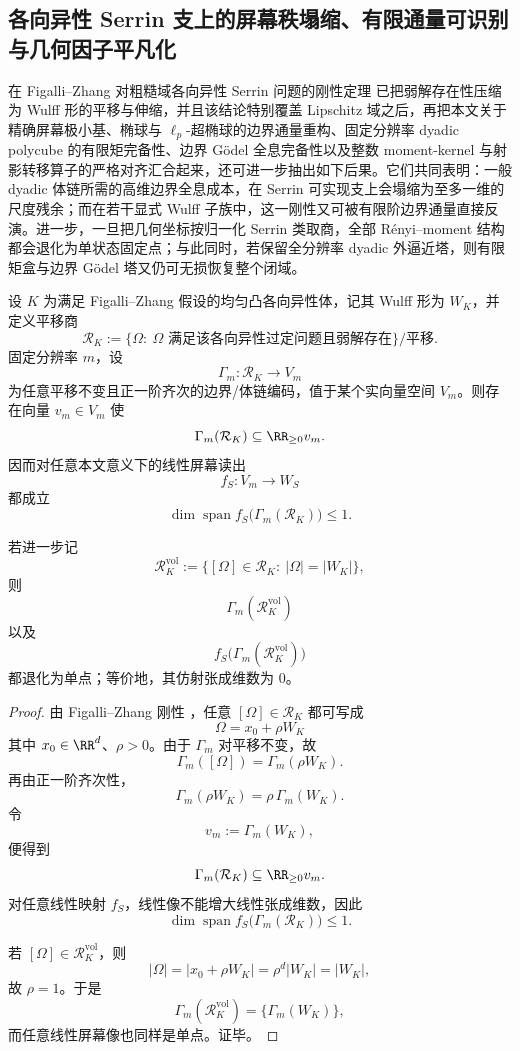 \subsection{各向异性 Serrin 支上的屏幕秩塌缩、有限通量可识别与几何因子平凡化}\label{subsec:conclusion-anisotropic-serrin-screen-flux-moment-holography}

在 Figalli--Zhang 对粗糙域各向异性 Serrin 问题的刚性定理 \cite{FigalliZhang2026AnisotropicSerrinGeneralDomains} 已把弱解存在性压缩为 Wulff 形的平移与伸缩，并且该结论特别覆盖 Lipschitz 域之后，再把本文关于精确屏幕极小基、椭球与 \(\ell_p\)-超椭球的边界通量重构、固定分辨率 dyadic polycube 的有限矩完备性、边界 Gödel 全息完备性以及整数 moment-kernel 与射影转移算子的严格对齐汇合起来，还可进一步抽出如下后果。它们共同表明：一般 dyadic 体链所需的高维边界全息成本，在 Serrin 可实现支上会塌缩为至多一维的尺度残余；而在若干显式 Wulff 子族中，这一刚性又可被有限阶边界通量直接反演。进一步，一旦把几何坐标按归一化 Serrin 类取商，全部 Rényi--moment 结构都会退化为单状态固定点；与此同时，若保留全分辨率 dyadic 外逼近塔，则有限矩盒与边界 Gödel 塔又仍可无损恢复整个闭域。

\begin{theorem}\label{thm:conclusion-serrin-support-screen-rank-atmost-one}
设 \(K\) 为满足 Figalli--Zhang 假设的均匀凸各向异性体，记其 Wulff 形为 \(W_K\)，并定义平移商
\[
\mathcal R_K
:=
\bigl\{\Omega:\ \Omega \text{ 满足该各向异性过定问题且弱解存在}\bigr\}/\text{平移}.
\]
固定分辨率 \(m\)，设
\[
\Gamma_m:\mathcal R_K\to V_m
\]
为任意平移不变且正一阶齐次的边界/体链编码，值于某个实向量空间 \(V_m\)。则存在向量 \(v_m\in V_m\) 使
\[
\Gamma_m(\mathcal R_K)\subseteq \RR_{\ge 0}v_m.
\]
因而对任意本文意义下的线性屏幕读出
\[
f_S:V_m\to W_S
\]
都成立
\[
\dim \operatorname{span} f_S\!\bigl(\Gamma_m(\mathcal R_K)\bigr)\le 1.
\]

若进一步记
\[
\mathcal R_K^{\mathrm{vol}}
:=
\{[\Omega]\in\mathcal R_K:\ |\Omega|=|W_K|\},
\]
则
\[
\Gamma_m(\mathcal R_K^{\mathrm{vol}})
\]
以及
\[
f_S\!\bigl(\Gamma_m(\mathcal R_K^{\mathrm{vol}})\bigr)
\]
都退化为单点；等价地，其仿射张成维数为 \(0\)。
\end{theorem}
\begin{proof}
由 Figalli--Zhang 刚性 \cite{FigalliZhang2026AnisotropicSerrinGeneralDomains}，任意 \([\Omega]\in\mathcal R_K\) 都可写成
\[
\Omega=x_0+\rho W_K
\]
其中 \(x_0\in\RR^d\)、\(\rho>0\)。由于 \(\Gamma_m\) 对平移不变，故
\[
\Gamma_m([\Omega])=\Gamma_m(\rho W_K).
\]
再由正一阶齐次性，
\[
\Gamma_m(\rho W_K)=\rho\,\Gamma_m(W_K).
\]
令
\[
v_m:=\Gamma_m(W_K),
\]
便得到
\[
\Gamma_m(\mathcal R_K)\subseteq \RR_{\ge0}v_m.
\]
对任意线性映射 \(f_S\)，线性像不能增大线性张成维数，因此
\[
\dim \operatorname{span} f_S\!\bigl(\Gamma_m(\mathcal R_K)\bigr)\le 1.
\]

若 \([\Omega]\in\mathcal R_K^{\mathrm{vol}}\)，则
\[
|\Omega|=|x_0+\rho W_K|=\rho^d|W_K|=|W_K|,
\]
故 \(\rho=1\)。于是
\[
\Gamma_m(\mathcal R_K^{\mathrm{vol}})=\{\Gamma_m(W_K)\},
\]
而任意线性屏幕像也同样是单点。证毕。
\end{proof}

